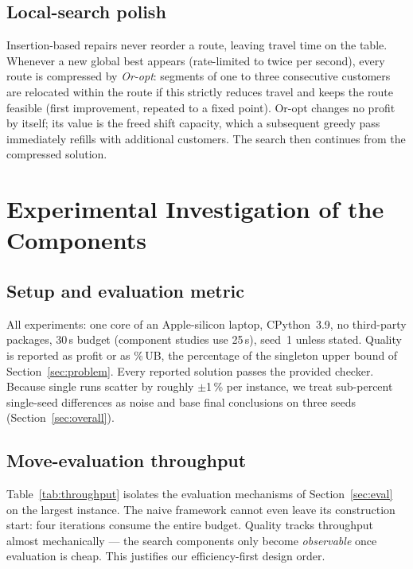\documentclass[10pt, a4paper]{article}
\newcommand{\ub}{\%\,UB}
\begin{document}
\subsection{Local-search polish}
Insertion-based repairs never reorder a route, leaving travel time on the
table. Whenever a new global best appears (rate-limited to twice per second),
every route is compressed by \emph{Or-opt}: segments of one to three
consecutive customers are relocated within the route if this strictly reduces
travel and keeps the route feasible (first improvement, repeated to a fixed
point). Or-opt changes no profit by itself; its value is the freed shift
capacity, which a subsequent greedy pass immediately refills with additional
customers. The search then continues from the compressed solution.

\section{Experimental Investigation of the Components}\label{sec:components}

\subsection{Setup and evaluation metric}
All experiments: one core of an Apple-silicon laptop, CPython~3.9, no
third-party packages, 30\,s budget (component studies use 25\,s), seed~1
unless stated. Quality is reported as profit or as \ub{}, the percentage of
the singleton upper bound of Section~\ref{sec:problem}. Every reported
solution passes the provided checker. Because single runs scatter by roughly
$\pm$1\,\% per instance, we treat sub-percent single-seed differences as
noise and base final conclusions on three seeds
(Section~\ref{sec:overall}).

\subsection{Move-evaluation throughput}\label{sec:exp-throughput}
Table~\ref{tab:throughput} isolates the evaluation mechanisms of
Section~\ref{sec:eval} on the largest instance. The naive framework cannot
even leave its construction start: four iterations consume the entire
budget. Quality tracks throughput almost mechanically --- the search
components only become \emph{observable} once evaluation is cheap. This
justifies our efficiency-first design order.
\end{document}
